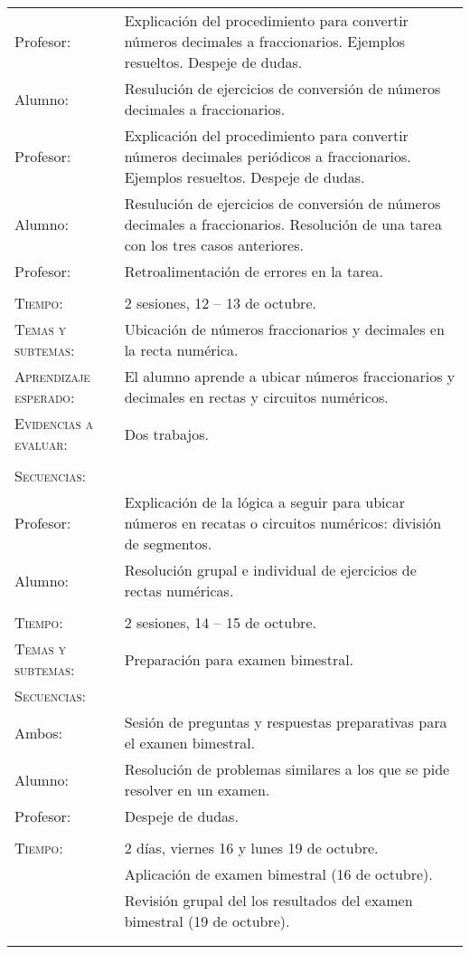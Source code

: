 \documentclass[letterpaper,10pt]{article}
\begin{document}
\begin{tabular}[t]{R{0.25\textwidth}p{0.71\textwidth}}

    Profesor: & Explicaci\'on del procedimiento para convertir
    n\'umeros decimales a fraccionarios. Ejemplos resueltos. Despeje de dudas.
    \\ Alumno: & Resuluci\'on de ejercicios de conversi\'on de n\'umeros
    decimales a fraccionarios. \\ Profesor: & Explicaci\'on del procedimiento
    para convertir n\'umeros decimales peri\'odicos a fraccionarios. Ejemplos
    resueltos. Despeje de dudas. \\ Alumno: & Resuluci\'on de ejercicios de
    conversi\'on de n\'umeros decimales a fraccionarios. Resoluci\'on de una
    tarea con los tres casos anteriores.  \\ Profesor: & Retroalimentaci\'on de
    errores en la tarea.
\\ \hline \\

    \textsc{Tiempo:}                   & 2 sesiones, 12 -- 13 de octubre. \\
    \textsc{Temas y subtemas:}         & Ubicaci\'on de n\'umeros fraccionarios
    y decimales en la recta num\'erica. \\
    \textsc{Aprendizaje esperado: }    & El alumno aprende a ubicar n\'umeros
    fraccionarios y decimales en rectas y circuitos num\'ericos. \\
    \textsc{Evidencias a evaluar:}     & Dos trabajos. \\\\
    \textsc{\large Secuencias:} \\
    Profesor: & Explicaci\'on de la l\'ogica a seguir para ubicar n\'umeros en
    recatas o circuitos num\'ericos: divisi\'on de segmentos. \\ Alumno: &
    Resoluci\'on grupal e individual de ejercicios de rectas num\'ericas.

\\ \hline \\

    \textsc{Tiempo:}                   & 2 sesiones, 14 -- 15 de octubre. \\
    \textsc{Temas y subtemas:}         & Preparaci\'on para examen bimestral. \\
    \textsc{\large Secuencias:} \\
    Ambos: & Sesi\'on de preguntas y respuestas preparativas para el examen bimestral. \\ Alumno: & Resoluci\'on de problemas similares a los que se pide resolver en un examen. \\ Profesor: & Despeje de dudas. 

\\ \hline \\

    \textsc{Tiempo:}& 2 d\'ias, viernes 16 y lunes 19 de octubre. \\
                    & {\Large \sc Aplicaci\'on de examen bimestral} (16 de octubre). \\ 
                    & Revisi\'on grupal del los resultados del examen bimestral (19 de octubre).\\
\\ \hline \\


\end{tabular}
\end{document}
